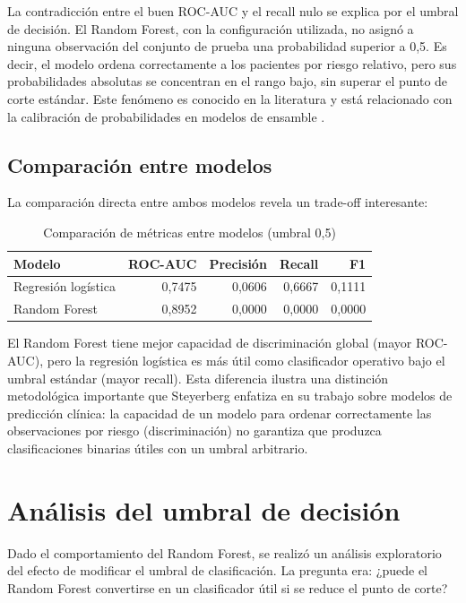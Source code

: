 \documentclass[12pt, a4paper, oneside]{report}
\begin{document}
La contradicción entre el buen ROC-AUC y el recall nulo se explica por el umbral de decisión. El Random Forest, con la configuración utilizada, no asignó a ninguna observación del conjunto de prueba una probabilidad superior a 0,5. Es decir, el modelo ordena correctamente a los pacientes por riesgo relativo, pero sus probabilidades absolutas se concentran en el rango bajo, sin superar el punto de corte estándar. Este fenómeno es conocido en la literatura y está relacionado con la calibración de probabilidades en modelos de ensamble \cite{niculescu2005predicting}.


\subsection{Comparación entre modelos}

La comparación directa entre ambos modelos revela un trade-off interesante:

\begin{table}[h]
\centering
\begin{tabular}{lrrrr}
\hline
\textbf{Modelo} & \textbf{ROC-AUC} & \textbf{Precisión} & \textbf{Recall} & \textbf{F1} \\
\hline
Regresión logística & 0,7475 & 0,0606 & 0,6667 & 0,1111 \\
Random Forest & 0,8952 & 0,0000 & 0,0000 & 0,0000 \\
\hline
\end{tabular}
\caption{Comparación de métricas entre modelos (umbral 0,5)}
\label{tab:comparacion}
\end{table}

El Random Forest tiene mejor capacidad de discriminación global (mayor ROC-AUC), pero la regresión logística es más útil como clasificador operativo bajo el umbral estándar (mayor recall). Esta diferencia ilustra una distinción metodológica importante que Steyerberg \cite{steyerberg2014clinical} enfatiza en su trabajo sobre modelos de predicción clínica: la capacidad de un modelo para ordenar correctamente las observaciones por riesgo (discriminación) no garantiza que produzca clasificaciones binarias útiles con un umbral arbitrario.

\section{Análisis del umbral de decisión}

Dado el comportamiento del Random Forest, se realizó un análisis exploratorio del efecto de modificar el umbral de clasificación. La pregunta era: ¿puede el Random Forest convertirse en un clasificador útil si se reduce el punto de corte?
\end{document}
